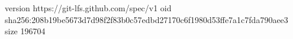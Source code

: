 version https://git-lfs.github.com/spec/v1
oid sha256:208b19be5673d7d98f2f83b0c57edbd27170c6f1980d53ffe7a1c7fda790aee3
size 196704
